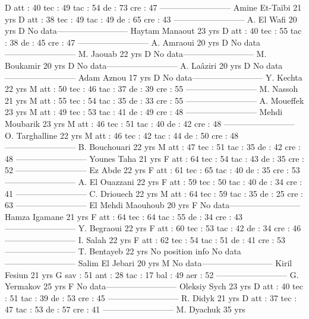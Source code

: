 D 
 att : 40 
 tec : 49 
 tac : 54 
 de : 73 
 cre : 47 
--------------------------
Amine Et-Taïbi  21 yrs 
D 
 att : 38 
 tec : 49 
 tac : 49 
 de : 65 
 cre : 43 
--------------------------
A. El Wafi  20 yrs 
D 
No data--------------------------
Haytam Manaout  23 yrs 
D 
 att : 40 
 tec : 55 
 tac : 38 
 de : 45 
 cre : 47 
--------------------------
A. Amraoui  20 yrs 
D 
No data--------------------------
M. Jaouab  22 yrs 
D 
No data--------------------------
M. Boukamir  20 yrs 
D 
No data--------------------------
A. Laâziri  20 yrs 
D 
No data--------------------------
Adam Aznou  17 yrs 
D 
No data--------------------------
Y. Kechta  22 yrs 
M 
 att : 50 
 tec : 46 
 tac : 37 
 de : 39 
 cre : 55 
--------------------------
M. Nassoh  21 yrs 
M 
 att : 55 
 tec : 54 
 tac : 35 
 de : 33 
 cre : 55 
--------------------------
A. Moueffek  23 yrs 
M 
 att : 49 
 tec : 53 
 tac : 41 
 de : 49 
 cre : 48 
--------------------------
Mehdi Moubarik  23 yrs 
M 
 att : 46 
 tec : 51 
 tac : 40 
 de : 42 
 cre : 48 
--------------------------
O. Targhalline  22 yrs 
M 
 att : 46 
 tec : 42 
 tac : 44 
 de : 50 
 cre : 48 
--------------------------
B. Bouchouari  22 yrs 
M 
 att : 47 
 tec : 51 
 tac : 35 
 de : 42 
 cre : 48 
--------------------------
Younes Taha  21 yrs 
F 
 att : 64 
 tec : 54 
 tac : 43 
 de : 35 
 cre : 52 
--------------------------
Ez Abde  22 yrs 
F 
 att : 61 
 tec : 65 
 tac : 40 
 de : 35 
 cre : 53 
--------------------------
A. El Ouazzani  22 yrs 
F 
 att : 59 
 tec : 50 
 tac : 40 
 de : 34 
 cre : 41 
--------------------------
C. Driouech  22 yrs 
M 
 att : 64 
 tec : 59 
 tac : 35 
 de : 25 
 cre : 63 
--------------------------
El Mehdi Maouhoub  20 yrs 
F 
No data--------------------------
Hamza Igamane  21 yrs 
F 
 att : 64 
 tec : 64 
 tac : 55 
 de : 34 
 cre : 43 
--------------------------
Y. Begraoui  22 yrs 
F 
 att : 60 
 tec : 53 
 tac : 42 
 de : 34 
 cre : 46 
--------------------------
I. Salah  22 yrs 
F 
 att : 62 
 tec : 54 
 tac : 51 
 de : 41 
 cre : 53 
--------------------------
T. Bentayeb  22 yrs 
No position info 
No data--------------------------
Salim El Jebari  20 yrs 
M 
No data--------------------------
Kiril Fesiun  21 yrs 
G 
 sav : 51 
 ant : 28 
 tac : 17 
 bal : 49 
 aer : 52 
--------------------------
G. Yermakov  25 yrs 
F 
No data--------------------------
Oleksiy Sych  23 yrs 
D 
 att : 40 
 tec : 51 
 tac : 39 
 de : 53 
 cre : 45 
--------------------------
R. Didyk  21 yrs 
D 
 att : 37 
 tec : 47 
 tac : 53 
 de : 57 
 cre : 41 
--------------------------
M. Dyachuk  35 yrs 
